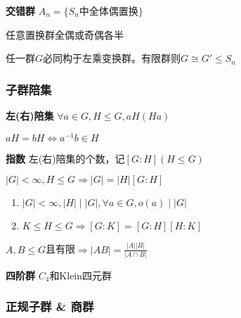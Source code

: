 \documentclass[a4paper,10pt]{ctexart}
\newcommand*{\impl}{\Rightarrow}
\renewcommand*{\iff}{\Leftrightarrow}
\renewcommand*{\leq}{\leqslant}
\begin{document}
\begin{multicols}{3}
    \textbf{交错群} $A_n = \{ S_n \text{中全体偶置换} \}$

    \begin{theorem}[置换群性质]
        任意置换群全偶或奇偶各半
    \end{theorem}

    \begin{theorem}[Cayley定理]
        任一群$G$必同构于左乘变换群。有限群则$G \!\cong\! G' \!\leq\! S_n$
    \end{theorem}

    \subsubsection{子群陪集}

    \textbf{左(右)陪集} $\forall a \!\in\! G, H \!\leq\! G, aH(Ha)$

    \begin{theorem}[陪集相等判则]
        $aH = bH \iff a^{-1}b \in H$
    \end{theorem}

    \textbf{指数} 左(右)陪集的个数，记$[G\!:\!H](H \!\leq\! G)$

    \begin{theorem}[Lagrange定理]
        $|G| \! < \! \infty, H \!\leq\! G \!\impl\! |G| \! = \! |H|[G:H]$
    \end{theorem}

    \begin{theorem}[指数性质]
        \hfil

        \begin{enumerate}
            \item $|G| < \infty, |H| \mid |G|, \forall a \in G, o(a) \mid |G|$
            \item $K \!\leq\! H \!\leq\! G \!\impl\! [G\!:\!K] \! = \! [G\!:\!H][H\!:\!K]$
        \end{enumerate}
    \end{theorem}

    \begin{theorem}[子群阶]
        $A, B \!\leq\! G$且有限$\impl |AB| = \frac{ |A| |B| }{ |A \cap B| }$
    \end{theorem}

    \textbf{四阶群} $C_4$和Klein四元群

    \subsubsection{正规子群 \& 商群}


\end{multicols}
\end{document}
